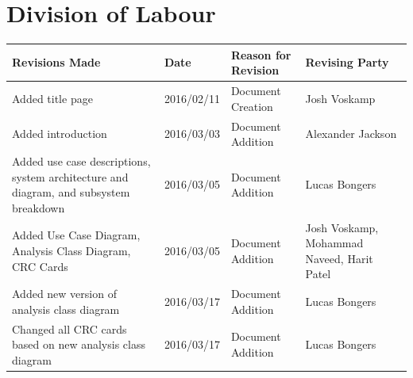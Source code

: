 \documentclass[]{article}
\begin{document}
\section*{Division of Labour}
\label{sec:division_of_labour}
\begin{table}[H]
	\centering
	\begin{tabular}{|p{5cm}|p{2cm}|p{3.5cm}|p{3cm}|}\hline
	    \textbf{Revisions Made} & \textbf{Date} & \textbf{Reason for Revision} & \textbf{Revising Party}\\\hline
		Added title page & 2016/02/11 & Document Creation & Josh Voskamp\\\hline
		Added introduction & 2016/03/03 & Document Addition & Alexander Jackson\\\hline
		Added use case descriptions, system architecture and diagram, and subsystem breakdown & 2016/03/05 & Document Addition & Lucas Bongers\\\hline
		Added Use Case Diagram, Analysis Class Diagram, CRC Cards & 2016/03/05 & Document Addition & Josh Voskamp, \break Mohammad Naveed, \break Harit Patel\\\hline
		Added new version of analysis class diagram & 2016/03/17 & Document Addition & Lucas Bongers\\\hline
		Changed all CRC cards based on new analysis class diagram & 2016/03/17 & Document Addition & Lucas Bongers\\\hline
	\end{tabular}
\end{table}
\vspace{3cm}
\end{document}
